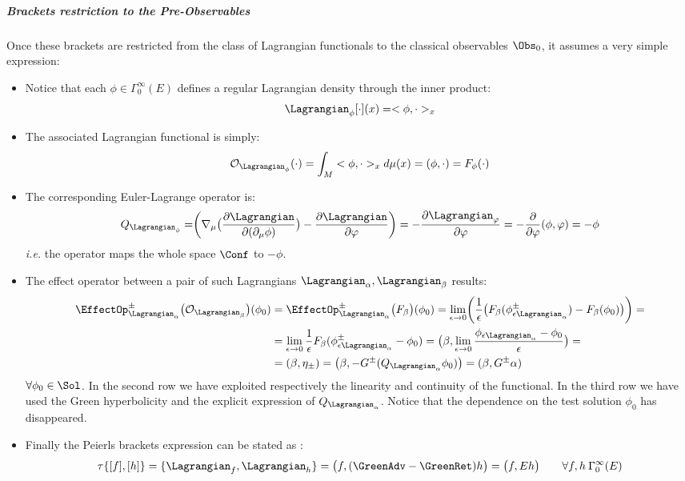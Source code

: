 \documentclass[Main]{subfiles}
\begin{document}
			\subparagraph{Brackets restriction to the Pre-Observables}
				Once these brackets are restricted from the class of Lagrangian functionals to the classical observables $\Obs_0$, it assumes a very simple expression:
				\begin{itemize}
					\item Notice that each $\phi \in \Gamma_0^\infty(E)$ defines a regular Lagrangian density through the inner product:
						\begin{displaymath}
							\Lagrangian_\phi[\cdot](x) = <\phi, \cdot>_x
						\end{displaymath}
					\item The associated Lagrangian functional is simply:
						\begin{displaymath}
							\mathcal{O}_{\Lagrangian_\phi} (\cdot ) = \int_M  <\phi, \cdot>_x d\mu(x) = (\phi, \cdot) = F_\phi (\cdot)
						\end{displaymath}
					\item The corresponding Euler-Lagrange operator is:
						\begin{displaymath}
							Q_{\Lagrangian_\phi}= \biggr( \nabla_\mu \big( \frac{\partial \Lagrangian}{\partial ( \partial_\mu \phi)} \big) - \frac{\partial \Lagrangian}{\partial \varphi} \biggr) = - \frac{\partial \Lagrangian_\varphi}{\partial \varphi} = -\frac{\partial}{\partial \varphi} (\phi, \varphi) = -\phi
						\end{displaymath}
						\textit{i.e.} the operator maps the whole space $\Conf$ to $-\phi$.
					\item The effect operator between a pair of such Lagrangians $\Lagrangian_\alpha, \Lagrangian_\beta$ results:
						\begin{align}
						\EffectOp_{\Lagrangian_\alpha}^\pm \big( \mathcal{O}_{\Lagrangian_\beta} \big) (\phi_0) &= \EffectOp_{\Lagrangian_\alpha}^\pm \big( F_\beta  \big) (\phi_0) = \lim_{\epsilon \rightarrow 0} \biggr( \frac{1}{\epsilon}\big(F_\beta ( \phi_{\epsilon \Lagrangian_\alpha}^\pm) - F_\beta(\phi_0) \big) \biggr) =\\
							&= \lim_{\epsilon \rightarrow 0} \frac{1}{\epsilon}F_\beta( \phi_{\epsilon \Lagrangian_\alpha}^\pm - \phi_0) = 
							\big(\beta, \lim_{\epsilon\rightarrow 0} \frac{ \phi_{\epsilon \Lagrangian_\alpha}  - \phi_0}{\epsilon} \big) = \\
							&=(\beta, \eta_\pm) = \big( \beta, - G^\pm (Q_{\Lagrangian_\alpha} \phi_0 ) \big) = ( \beta, G^\pm \alpha)
						\end{align}
						 $\forall 	\phi_0\in \Sol$.
						 In the second row we have exploited respectively the linearity and continuity of the functional.
						 In the third row we have used the Green hyperbolicity and the explicit expression of $Q_{\Lagrangian_\alpha}$.
						 Notice that the dependence on the test solution $\phi_0$ has disappeared.
					\item Finally the Peierls brackets expression can be stated as :
						\begin{equation}\label{Def:SymplecticTau}
							\tau\{ [f] , [h]\} = \{\Lagrangian_f , \Lagrangian_h\} = \big( f , (\GreenAdv - \GreenRet)h \big) = \big(f, E h\big) \qquad \forall f,h \: \Gamma_0^\infty (E)
						\end{equation}
				\end{itemize}
\end{document}
